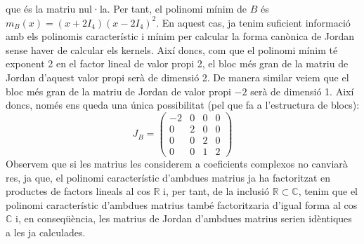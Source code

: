 \documentclass[11pt,a4paper]{article}
\begin{document}
        que és la matriu nul·la. Per tant, el polinomi mínim de $B$ és $m_B(x)=(x+2I_4)(x-2I_4)^2$. En aquest cas, ja tenim suficient informació amb els polinomis característic i mínim per calcular la forma canònica de Jordan sense haver de calcular els kernels. Així doncs, com que el polinomi mínim té exponent 2 en el factor lineal de valor propi 2, el bloc més gran de la matriu de Jordan d'aquest valor propi serà de dimensió 2. De manera similar veiem que el bloc més gran de la matriu de Jordan de valor propi $-2$ serà de dimensió 1. Així doncs, només ens queda una única possibilitat (pel que fa a l'estructura de blocs):
        \begin{equation*}
            J_B=\begin{pmatrix}
            -2 & 0 & 0 & 0\\
            0 & 2 & 0 & 0\\
            0 & 0 & 2 & 0\\
            0 & 0 & 1 & 2
            \end{pmatrix}
        \end{equation*}
        Observem que si les matrius les considerem a coeficients complexos no canviarà res, ja que, el polinomi característic d'ambdues matrius ja ha factoritzat en productes de factors lineals al cos $\mathbb{R}$ i, per tant, de la inclusió $\mathbb{R}\subset\mathbb{C}$, tenim que el polinomi característic d'ambdues matrius també factoritzaria d'igual forma al cos $\mathbb{C}$ i, en conseqüència, les matrius de Jordan d'ambdues matrius serien idèntiques a les ja calculades.
\end{document}
